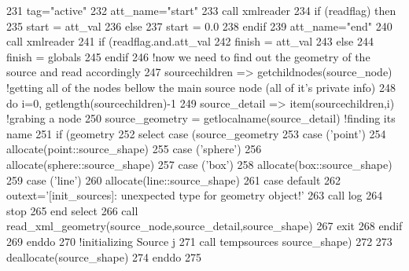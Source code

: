 \begin{DoxyCode}
231         tag=\textcolor{stringliteral}{"active"}
232         att\_name=\textcolor{stringliteral}{"start"}
233         \textcolor{keyword}{call }xmlreader%
234         \textcolor{keywordflow}{if} (readflag) \textcolor{keywordflow}{then}
235             start = att\_val%
236         \textcolor{keywordflow}{else}
237             start = 0.0
238 \textcolor{keywordflow}{        endif}
239         att\_name=\textcolor{stringliteral}{"end"}
240         \textcolor{keyword}{call }xmlreader%
241         \textcolor{keywordflow}{if} (readflag.and.att\_val%
242             finish = att\_val%
243         \textcolor{keywordflow}{else}
244             finish = globals%
245 \textcolor{keywordflow}{        endif}
246         \textcolor{comment}{!now we need to find out the geometry of the source and read accordingly}
247         sourcechildren => getchildnodes(source\_node) \textcolor{comment}{!getting all of the nodes bellow the main source node
       (all of it's private info)}
248         \textcolor{keywordflow}{do} i=0, getlength(sourcechildren)-1
249             source\_detail => item(sourcechildren,i) \textcolor{comment}{!grabing a node}
250             source\_geometry = getlocalname(source\_detail)  \textcolor{comment}{!finding its name}
251             \textcolor{keywordflow}{if} (geometry%
252                 \textcolor{keywordflow}{select case} (source\_geometry%
253                 \textcolor{keywordflow}{case} (\textcolor{stringliteral}{'point'})
254                     \textcolor{keyword}{allocate}(point::source\_shape)
255                 \textcolor{keywordflow}{case} (\textcolor{stringliteral}{'sphere'})
256                     \textcolor{keyword}{allocate}(sphere::source\_shape)
257                 \textcolor{keywordflow}{case} (\textcolor{stringliteral}{'box'})
258                     \textcolor{keyword}{allocate}(box::source\_shape)
259                 \textcolor{keywordflow}{case} (\textcolor{stringliteral}{'line'})
260                     \textcolor{keyword}{allocate}(line::source\_shape)
261 \textcolor{keywordflow}{                    case default}
262                     outext=\textcolor{stringliteral}{'[init\_sources]: unexpected type for geometry object!'}
263                     \textcolor{keyword}{call }log%
264                     stop
265 \textcolor{keywordflow}{                end select}
266                 \textcolor{keyword}{call }read\_xml\_geometry(source\_node,source\_detail,source\_shape)
267                 \textcolor{keywordflow}{exit}
268 \textcolor{keywordflow}{            endif}
269 \textcolor{keywordflow}{        enddo}
270         \textcolor{comment}{!initializing Source j}
271         \textcolor{keyword}{call }tempsources%
      source\_shape)
272 
273         \textcolor{keyword}{deallocate}(source\_shape)
274 \textcolor{keywordflow}{    enddo}
275 
\end{DoxyCode}
